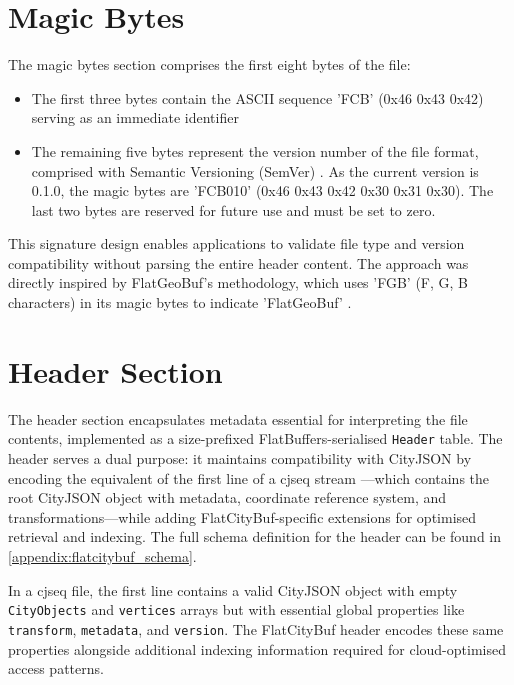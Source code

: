\section{Magic Bytes}
\label{methodology:file_components:magic_bytes}

The magic bytes section comprises the first eight bytes of the file:
\begin{itemize}
  \item The first three bytes contain the ASCII sequence 'FCB' (0x46 0x43 0x42) serving as an immediate identifier
  \item The remaining five bytes represent the version number of the file format, comprised with Semantic Versioning (SemVer) \citep{semver}. As the current version is 0.1.0, the magic bytes are 'FCB010' (0x46 0x43 0x42 0x30 0x31 0x30). The last two bytes are reserved for future use and must be set to zero.
\end{itemize}

This signature design enables applications to validate file type and version compatibility without parsing the entire header content. The approach was directly inspired by FlatGeoBuf's methodology, which uses 'FGB' (F, G, B characters) in its magic bytes to indicate 'FlatGeoBuf' \citep{horance_2022}.

\section{Header Section}
\label{methodology:file_components:header}

The header section encapsulates metadata essential for interpreting the file contents, implemented as a size-prefixed FlatBuffers-serialised \texttt{Header} table. The header serves a dual purpose: it maintains compatibility with CityJSON by encoding the equivalent of the first line of a \ac{cjseq} stream \citep{ledoux_2024}—which contains the root CityJSON object with metadata, coordinate reference system, and transformations—while adding FlatCityBuf-specific extensions for optimised retrieval and indexing. The full schema definition for the header can be found in \autoref{appendix:flatcitybuf_schema}.

In a \ac{cjseq} file, the first line contains a valid CityJSON object with empty \texttt{CityObjects} and \texttt{vertices} arrays but with essential global properties like \texttt{transform}, \texttt{metadata}, and \texttt{version}. The FlatCityBuf header encodes these same properties alongside additional indexing information required for cloud-optimised access patterns.

